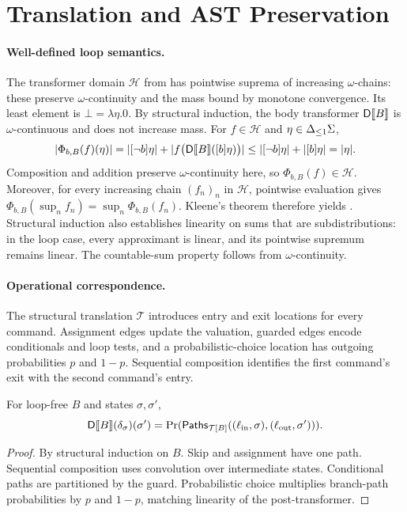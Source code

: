 \section{Translation and AST Preservation}
\label{app:translation}

\paragraph{Well-defined loop semantics.}
The transformer domain $\mathcal{H}$ from  has pointwise suprema of increasing $\omega$-chains: these preserve $\omega$-continuity and the mass bound by monotone convergence. Its least element is $\bot=\lambda\eta.0$. By structural induction, the body transformer $\mathsf{D}\llbracket B\rrbracket$ is $\omega$-continuous and does not increase mass. For $f\in\mathcal{H}$ and $\eta\in{\Delta_{\leq 1}\Sigma}$,
\[
 |\Phi_{b,B}(f)(\eta)|
 =|[\neg b]\eta|
   +|f\bigl(\mathsf{D}\llbracket B\rrbracket([b]\eta)\bigr)|
 \leq|[\neg b]\eta|+|[b]\eta|
 =|\eta|.
\]
Composition and addition preserve $\omega$-continuity here, so $\Phi_{b,B}(f)\in\mathcal{H}$. Moreover, for every increasing chain $(f_n)_n$ in $\mathcal{H}$, pointwise evaluation gives $\Phi_{b,B}(\sup_n f_n)=\sup_n\Phi_{b,B}(f_n)$. Kleene's theorem therefore yields . Structural induction also establishes linearity on sums that are subdistributions: in the loop case, every approximant is linear, and its pointwise supremum remains linear. The countable-sum property follows from $\omega$-continuity.

\paragraph{Operational correspondence.}
The structural translation $\mathcal{T}$ introduces entry and exit locations for every command. Assignment edges update the valuation, guarded edges encode conditionals and loop tests, and a probabilistic-choice location has outgoing probabilities $p$ and $1-p$. Sequential composition identifies the first command's exit with the second command's entry.

\begin{lemma}
For loop-free $B$ and states $\sigma,\sigma'$,
\[
 \mathsf{D}\llbracket B\rrbracket(\delta_{\sigma})(\sigma')
 =\Pr(\mathsf{Paths}_{\mathcal{T}[B]}((\ell_{\rm in},\sigma),(\ell_{\rm out},\sigma'))).
\]
\end{lemma}
\begin{proof}
By structural induction on $B$. Skip and assignment have one path. Sequential composition uses convolution over intermediate states. Conditional paths are partitioned by the guard. Probabilistic choice multiplies branch-path probabilities by $p$ and $1-p$, matching linearity of the post-transformer.
\end{proof}

